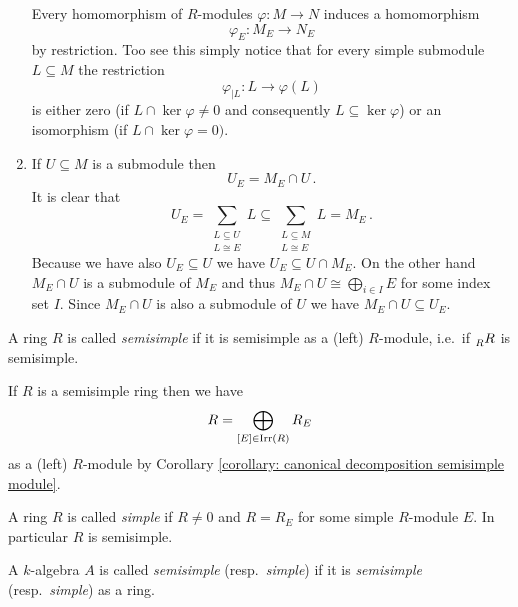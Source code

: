 \begin{remark}
\begin{enumerate}[label=\emph{\alph*)},leftmargin=*]
      Every homomorphism of $R$-modules $\varphi \colon M \to N$ induces a homomorphism
      \[
                \varphi_E
        \colon  M_E
        \to     N_E
      \]
      by restriction.
      Too see this simply notice that for every simple submodule $L \subseteq M$ the restriction
      \[
                \varphi_{|L}
        \colon  L
        \to     \varphi(L)
      \]
      is either zero (if $L \cap \ker \varphi \neq 0$ and consequently $L \subseteq \ker \varphi$) or an isomorphism (if $L \cap \ker \varphi = 0)$.
    \item
      If $U \subseteq M$ is a submodule then
      \[
          U_E
        = M_E \cap U \,.
      \]
      It is clear that
      \[
                  U_E
        =         \sum_{\substack{L \subseteq U \\ L \cong E}} L
        \subseteq \sum_{\substack{L \subseteq M \\ L \cong E}} L
        =         M_E \,.
      \]
      Because we have also $U_E \subseteq U$ we have $U_E \subseteq U \cap M_E$.
      On the other hand $M_E \cap U$ is a submodule of $M_E$ and thus $M_E \cap U \cong \bigoplus_{i \in I} E$ for some index set $I$.
      Since $M_E \cap U$ is also a submodule of $U$ we have $M_E \cap U \subseteq U_E$.
  \end{enumerate}
\end{remark}


\begin{definition}
  A ring $R$ is called \emph{semisimple} if it is semisimple as a (left) $R$-module, i.e.\ if $\prescript{}{R}{R}$ is semisimple.
\end{definition}


If $R$ is a semisimple ring then we have
\[
    R
  = \bigoplus_{[E] \in \operatorname{Irr}(R)} R_E
\]
as a (left) $R$-module by Corollary \ref{corollary: canonical decomposition semisimple module}.


\begin{definition}
  A ring $R$ is called \emph{simple} if $R \neq 0$ and $R = R_E$ for some simple $R$-module $E$.
  In particular $R$ is semisimple.
\end{definition}


\begin{definition}
  A $k$-algebra $A$ is called \emph{semisimple} (resp.\ \emph{simple}) if it is \emph{semisimple} (resp.\ \emph{simple}) as a ring.
\end{definition}


